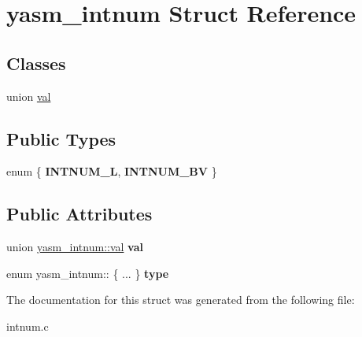 \hypertarget{structyasm__intnum}{\section{yasm\-\_\-intnum Struct Reference}
\label{structyasm__intnum}
}
\subsection*{Classes}
\begin{DoxyCompactItemize}
\item 
union \hyperlink{unionyasm__intnum_1_1val}{val}
\end{DoxyCompactItemize}
\subsection*{Public Types}
\begin{DoxyCompactItemize}
\item 
enum \{ {\bfseries I\-N\-T\-N\-U\-M\-\_\-\-L}, 
{\bfseries I\-N\-T\-N\-U\-M\-\_\-\-B\-V}
 \}
\end{DoxyCompactItemize}
\subsection*{Public Attributes}
\begin{DoxyCompactItemize}
\item 
\hypertarget{structyasm__intnum_a77d1042c914bc195f29e99d5a3fac82e}{union \hyperlink{unionyasm__intnum_1_1val}{yasm\-\_\-intnum\-::val} {\bfseries val}}\label{structyasm__intnum_a77d1042c914bc195f29e99d5a3fac82e}

\item 
\hypertarget{structyasm__intnum_a38ee6c8d301f2214afb8c955217f5a51}{enum yasm\-\_\-intnum\-:: \{ ... \}  {\bfseries type}}\label{structyasm__intnum_a38ee6c8d301f2214afb8c955217f5a51}

\end{DoxyCompactItemize}


The documentation for this struct was generated from the following file\-:\begin{DoxyCompactItemize}
\item 
intnum.\-c\end{DoxyCompactItemize}
